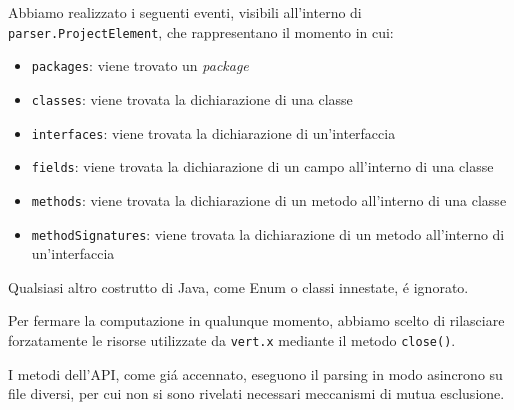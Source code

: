 \documentclass[report]{subfiles}
\begin{document}
	Abbiamo realizzato i seguenti eventi, visibili all'interno di \texttt{parser.ProjectElement}, che rappresentano il momento in cui:
	\begin{itemize}
		\item \texttt{packages}: viene trovato un \emph{package}
		\item \texttt{classes}: viene trovata la dichiarazione di una classe
		\item \texttt{interfaces}: viene trovata la dichiarazione di un'interfaccia
		\item \texttt{fields}: viene trovata la dichiarazione di un campo all'interno di una classe
		\item \texttt{methods}: viene trovata la dichiarazione di un metodo all'interno di una classe
		\item \texttt{methodSignatures}: viene trovata la dichiarazione di un metodo all'interno di un'interfaccia
	\end{itemize}
	
	Qualsiasi altro costrutto di Java, come Enum o classi innestate, \'e ignorato.
	
	Per fermare la computazione in qualunque momento, abbiamo scelto di rilasciare forzatamente le risorse utilizzate da \texttt{vert.x} mediante il metodo \texttt{close()}.
	
	I metodi dell'API, come gi\'a accennato, eseguono il parsing in modo asincrono su file diversi, per cui non si sono rivelati necessari meccanismi di mutua esclusione.
	
\end{document}
